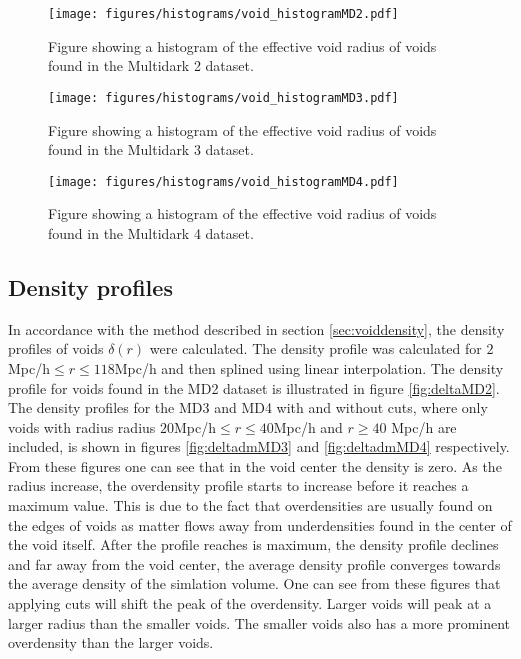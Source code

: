 \begin{figure}[H]
    \texttt{[image: figures/histograms/void\_histogramMD2.pdf]}
    \caption{Figure showing a histogram of the effective void radius of voids found in the Multidark 2 dataset.}
    \label{fig:voidhistMD2}
\end{figure}
\begin{figure}[H]
    \texttt{[image: figures/histograms/void\_histogramMD3.pdf]}
    \caption{Figure showing a histogram of the effective void radius of voids found in the Multidark 3 dataset.}
    \label{fig:voidhistMD3}
\end{figure}
\begin{figure}[H]
    \texttt{[image: figures/histograms/void\_histogramMD4.pdf]}
    \caption{Figure showing a histogram of the effective void radius of voids found in the Multidark 4 dataset.}
    \label{fig:voidhistMD4}
\end{figure}
\subsection{Density profiles}
In accordance with the method described in section \ref{sec:voiddensity}, the density profiles of voids $\delta(r)$ were calculated. The density profile was calculated for $2$Mpc/h$\leq r\leq 118$Mpc/h and then splined using linear interpolation. The density profile for voids found in the MD2 dataset is illustrated in figure \ref{fig:deltaMD2}. The density profiles for the MD3 and MD4 with and without cuts, where only voids with radius radius $20$Mpc/h$\leq r\leq 40$Mpc/h and $r\geq 40$ Mpc/h are included, is shown in figures \ref{fig:deltadmMD3} and \ref{fig:deltadmMD4} respectively. From these figures one can see that in the void center the density is zero. As the radius increase, the overdensity profile starts to increase before it reaches a maximum value. This is due to the fact that overdensities are usually found on the edges of voids as matter flows away from underdensities found in the center of the void itself. After the profile reaches is maximum, the density profile declines and far away from the void center, the average density profile converges towards the average density of the simlation volume. One can see from these figures that applying cuts will shift the peak of the overdensity. Larger voids will peak at a larger radius than the smaller voids. The smaller voids also has a more prominent overdensity than the larger voids.\\\indent
 

